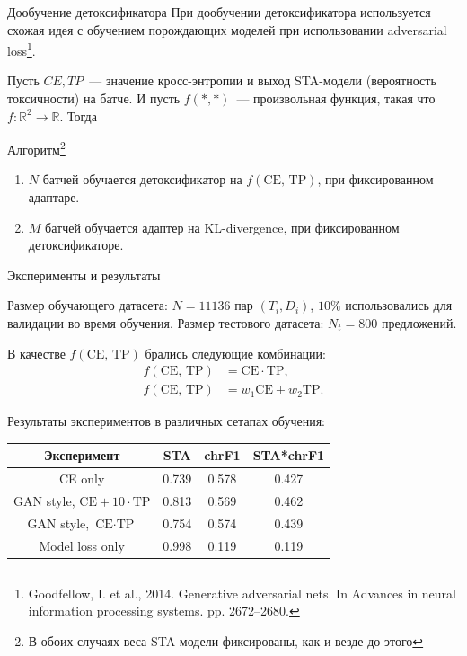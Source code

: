 \documentclass[12pt, fleqn, xcolor=x11names, xcolor=table, aspectratio=169]{beamer}
\begin{document}

\begin{frame}{Дообучение детоксификатора}
При дообучении детоксификатора используется схожая идея с обучением порождающих моделей при использовании adversarial loss\footnote{Goodfellow, I. et al., 2014. Generative adversarial nets. In Advances in neural information processing systems. pp. 2672–2680.}.

Пусть $CE, TP$~--- значение кросс-энтропии и выход STA-модели (вероятность токсичности) на батче.
И пусть $f(*, *)$~--- произвольная функция, такая что $f: \mathbb{R}^2 \to \mathbb{R}$.
Тогда

\begin{alertblock}{Алгоритм\footnote{В обоих случаях веса STA-модели фиксированы, как и везде до этого}}
\begin{enumerate}
    \item $N$ батчей обучается детоксификатор на $f(\text{CE, TP})$, при фиксированном адаптаре. 
    \item $M$ батчей обучается адаптер на KL-divergence, при фиксированном детоксификаторе.
\end{enumerate}
\end{alertblock}
\end{frame}


\begin{frame}{Эксперименты и результаты}

Размер обучающего датасета: $N = 11136$ пар $\left(T_i, D_i \right)$, $10\%$ использовались для валидации во время обучения.
Размер тестового датасета: $N_t = 800$ предложений.

В качестве $f(\text{CE, TP})$ брались следующие комбинации: 
\begin{align*}
    f(\text{CE, TP}) &= \text{CE} \cdot \text{TP}, \\
    f(\text{CE, TP}) &= w_1 \text{CE} + w_2 \text{TP}.
\end{align*}

Результаты экспериментов в различных сетапах обучения:

\begin{table}[ht]
\centering
 \begin{tabular}{|c|c c c|} 
 \hline
 Эксперимент & STA & chrF1 & STA*chrF1 \\ [0.5ex] 
 \hline
 CE only & 0.739 & 0.578 & 0.427 \\ 
 \rowcolor{aquamarine} GAN style, $\text{CE} + 10 \cdot \text{TP}$ & 0.813 & 0.569 & 0.462 \\
  GAN style, $\text{CE} \cdot \text{TP}$  & 0.754 & 0.574 & 0.439 \\
 Model loss only & 0.998 & 0.119 & 0.119 \\ 
 \hline
 \end{tabular}
\end{table}

\end{frame}
\end{document}
